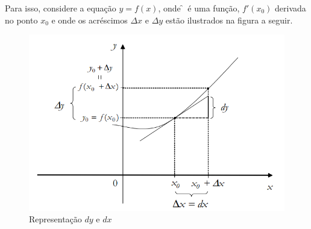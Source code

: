 \cleardoublepage\documentclass[../main.tex]{subfiles}
\begin{document}
Para isso, considere a equação $y= f(x)$, onde \f~é uma função, $f'(x_0)$ derivada no ponto $x_0$ e onde os acréscimos $\Delta x$ e $\Delta y$ estão ilustrados na figura a seguir.
\begin{figure}[H]
    \centering
    \includegraphics[scale=0.7]{fig_apl_deriv/AplicDerivDiferencial.png}
    \caption{Representação $dy$ e $dx$}
\end{figure}
\end{document}

